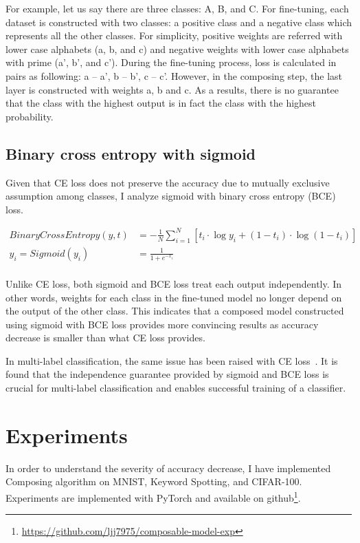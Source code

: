 \documentclass{article}
\begin{document}
For example, let us say there are three classes: A, B, and C. For fine-tuning, each dataset is constructed with two classes: a positive class and a negative class which represents all the other classes. For simplicity, positive weights are referred with lower case alphabets (a, b, and c) and negative weights with lower case alphabets with prime (a', b', and c'). During the fine-tuning process, loss is calculated in pairs as following: a -- a', b -- b', c -- c'. However, in the composing step, the last layer is constructed with weights a, b and c. As a results, there is no guarantee that the class with the highest output is in fact the class with the highest probability.

\subsection{Binary cross entropy with sigmoid}

Given that CE loss does not preserve the accuracy due to mutually exclusive assumption among classes, I analyze sigmoid with binary cross entropy (BCE) loss.

\begin{align*}
BinaryCrossEntropy(y, t) & = -\frac{1}{N}\sum_{i=1}^N \left[ t_i \cdot \log y_i + (1 - t_i) \cdot \log (1 - t_i) \right] \\
y_i = Sigmoid(y_i) &= \frac{1}{1 + e^{-x_i}} \\
\end{align*}

Unlike CE loss, both sigmoid and BCE loss treat each output independently. In other words, weights for each class in the fine-tuned model no longer depend on the output of the other class. This indicates that a composed model constructed using sigmoid with BCE loss provides more convincing results as accuracy decrease is smaller than what CE loss provides.

In multi-label classification, the same issue has been raised with CE loss~\cite{liu2017deep}. It is found that the independence guarantee provided by sigmoid and BCE loss is crucial for multi-label classification and enables successful training of a classifier.

\section{Experiments}

In order to understand the severity of accuracy decrease, I have implemented Composing algorithm on MNIST, Keyword Spotting, and CIFAR-100. Experiments are implemented with PyTorch and available on github\footnote{\url{https://github.com/ljj7975/composable-model-exp}}.
\end{document}
